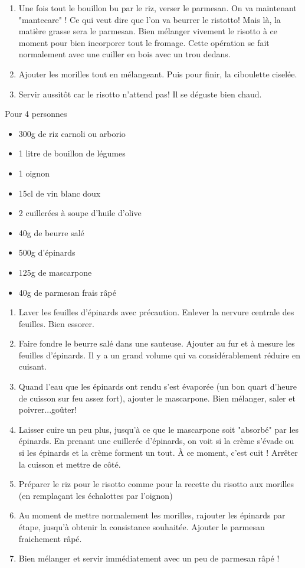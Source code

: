 {\begin{enumerate}
	\item Une fois tout le bouillon bu par le riz, verser le parmesan. On va maintenant "mantecare" ! Ce qui veut dire que l'on va beurrer le ristotto! Mais là, la matière grasse sera le parmesan. Bien mélanger vivement le risotto à ce moment pour bien incorporer tout le fromage. Cette opération se fait normalement avec une cuiller en bois avec un trou dedans.
	\item Ajouter les morilles tout en mélangeant. Puis pour finir, la ciboulette ciselée. 
	\item Servir aussitôt car le risotto n'attend pas! Il se déguste bien chaud.
\end{enumerate}}

\bigskip
{}
{Pour 4 personnes}{\begin{itemize}
	\item 300g de riz carnoli ou arborio
	\item 1 litre de bouillon de légumes
	\item 1 oignon
	\item 15cl de vin blanc doux
	\item 2 cuillerées à soupe d'huile d'olive
	\item 40g de beurre salé
	\item 500g d'épinards
	\item 125g de mascarpone
	\item 40g de parmesan frais râpé
\end{itemize}}
{\begin{enumerate}
	\item Laver les feuilles d'épinards avec précaution. Enlever la nervure centrale des feuilles. Bien essorer.
	\item Faire fondre le beurre salé dans une sauteuse. Ajouter au fur et à mesure les feuilles d'épinards. Il y a un grand volume qui va considérablement réduire en cuisant.
	\item Quand l'eau que les épinards ont rendu s'est évaporée (un bon quart d'heure de cuisson sur feu assez fort), ajouter le mascarpone.  Bien mélanger, saler et poivrer...goûter!
	\item Laisser cuire un peu plus, jusqu'à ce que le mascarpone soit "absorbé" par les épinards. En prenant une cuillerée d'épinards, on voit si la crème s'évade ou si les épinards et la crème forment un tout.  À ce moment, c'est cuit ! Arrêter la cuisson et mettre de côté.
	\item Préparer le riz pour le risotto comme pour la recette du risotto aux morilles (en remplaçant les échalottes par l'oignon)
	\item Au moment de mettre normalement les morilles, rajouter les épinards par étape, jusqu'à obtenir la consistance souhaitée. Ajouter le parmesan fraichement râpé. 
	\item Bien mélanger et servir immédiatement avec un peu de parmesan râpé !
\end{enumerate}}

